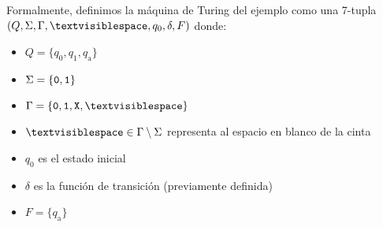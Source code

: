 \documentclass{article}
\theoremstyle{definition}
\begin{document}
Formalmente, definimos la máquina de Turing del ejemplo como una 7-tupla $(Q, \Sigma, \Gamma, \textvisiblespace, q_0, \delta, F)$ donde:
 \begin{itemize}
   \item $Q = \{q_0, q_1, q_{\text{a}}\}$
   \item $\Sigma = \{{\tt 0,1}\}$
   \item $\Gamma = \{{\tt 0,1, X, \textvisiblespace}\}$
   \item $\textvisiblespace \in \Gamma \setminus \Sigma$ representa al espacio en
     blanco de la cinta
   \item $q_0$ es el estado inicial
   \item $\delta$ es la función de transición (previamente definida)
   \item $F = \{ q_{\text{a}} \}$
 \end{itemize}




\end{document}
